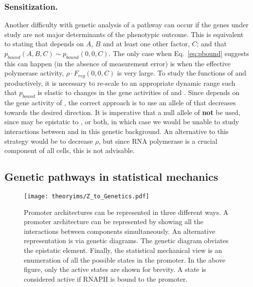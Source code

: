 \subsubsection*{Sensitization.}
Another difficulty with genetic analysis of a pathway can occur if the genes
under study are not major determinants of the phenotypic outcome. This is
equivalent to stating that \Freg{} depends on \(A\), \(B\) and at least one
other factor, \(C\); and that \(p_{bound}(A, B, C) \sim p_{bound}(0, 0, C)\).
The only case when Eq.~\ref{eq:pbound} suggests this can happen (in the absence
of measurement error) is when the effective polymerase activity, \(\rho\cdot
F_{reg}(0, 0, C)\) is very large. To study the functions of  and
 productively, it is necessary to re-scale \Freg{} to an appropriate
dynamic range such that \(p_{bound}\) is elastic to changes in the gene
activities of  and . Since \Freg{} depends on the gene
activity of , the correct approach is to use an allele of  that
decreases \Freg{} towards the desired direction. It is imperative that a
null allele of  \textbf{not} be used, since  may be epistatic to
,  or both, in which case we would be unable to study
interactions between  and  in this genetic background. An
alternative to this strategy would be to decrease \(\rho\), but since RNA
polymerase is a crucial component of all cells, this is not advisable.

\subsection*{Genetic pathways in statistical mechanics}

\begin{figure}
  \texttt{[image: theoryims/Z\_to\_Genetics.pdf]}
  \caption{Promoter architectures can be represented in three different ways.
  A promoter architecture can be represented by showing all the interactions
  between components simultaneously. An alternative representation is via
  genetic diagrams. The genetic diagram obviates the epistatic element. Finally,
  the statistical mechanical view is an enumeration of all the possible states
  in the promoter. In the above figure, only the active states are shown for
  brevity. A state is considered active if RNAPII is bound to the promoter.
  }\label{fig:Z_to_Genetics}
\end{figure}

